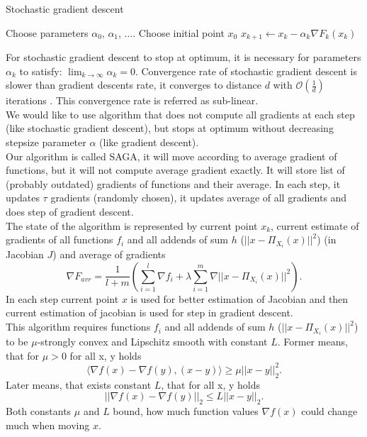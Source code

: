 \documentclass[11pt]{book}
\begin{document}
\begin{algorithm}[H]
	\caption{Stochastic gradient descent}
	\label{alg:sgd}
	\begin{algorithmic}[1]
		\State Choose parameters $\alpha_0$, $\alpha_1$, $\dots$.
		\State Choose initial point $x_0$
		\State $x_{k+1} \leftarrow x_k - \alpha_k\nabla F_k(x_k) $
		\EndFor
	\end{algorithmic}
\end{algorithm}

For stochastic gradient descent to stop at optimum, it is necessary for parameters $\alpha_k$ to satisfy: $\lim_{k \rightarrow \infty}\alpha_k=0 $. Convergence rate of stochastic gradient descent is slower than gradient descents rate, it converges to distance $d$ with $\mathcal{O}(\frac{1}{d})$ iterations \cite{SGD}. This convergence rate is referred as sub-linear.\\

We would like to use algorithm that does not compute all gradients at each step (like stochastic gradient descent), but stops at optimum without decreasing stepsize parameter $\alpha$ (like gradient descent).\\

Our algorithm is called SAGA, it will move according to average gradient of functions, but it will not compute average gradient exactly. It will store list of (probably outdated) gradients of functions and their average. In each step, it updates $\tau$ gradients (randomly chosen), it updates average of all gradients and does step of gradient descent.\\

The state of the algorithm is represented by current point $x_k$, current estimate of gradients of all functions $f_i$ and all addends of sum $h$ ($||x-\Pi_{X_i}(x)||^2$) (in Jacobian $J$) and average of gradients $$\nabla F_{avr}= \frac{1}{l+m}\left( \sum_{i=1}^l \nabla f_i + \lambda\sum_{i=1}^m \nabla ||x-\Pi_{X_i}(x)||^2 \right).$$ In each step current point $x$ is used for better estimation of Jacobian and then current estimation of jacobian is used for step in gradient descent.\\

This algorithm requires functions $f_i$ and all addends of sum $h$ ($||x-\Pi_{X_i}(x)||^2$) to be $\mu$-strongly convex and Lipschitz smooth with constant $L$. Former means, that for $\mu>0$ for all x, y holds $$\langle \nabla f(x) - \nabla f(y), (x-y) \rangle \geq \mu ||x-y||_2^2. $$
Later means, that exists constant $L$, that for all x, y holds $$||\nabla f(x) - \nabla f(y)||_2 \leq L ||x-y||_2.$$ Both constants $\mu$ and $L$ bound, how much function values $\nabla f(x)$ could change much when moving $x$.
\end{document}
